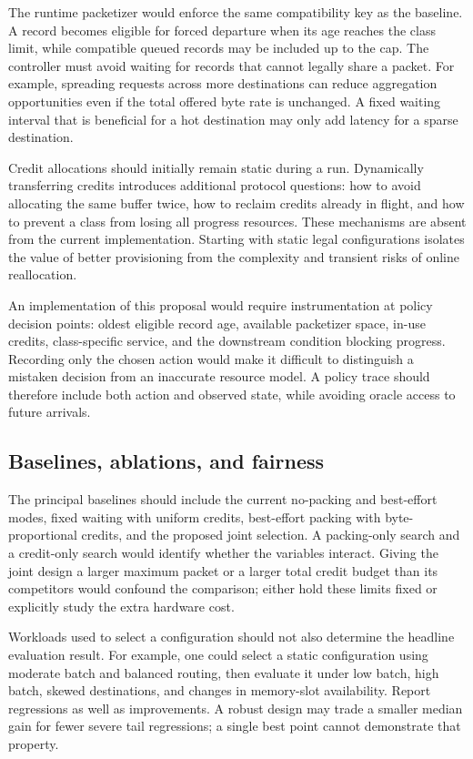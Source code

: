The runtime packetizer would enforce the same compatibility key as the baseline. A record becomes eligible for forced departure when its age reaches the class limit, while compatible queued records may be included up to the cap. The controller must avoid waiting for records that cannot legally share a packet. For example, spreading requests across more destinations can reduce aggregation opportunities even if the total offered byte rate is unchanged. A fixed waiting interval that is beneficial for a hot destination may only add latency for a sparse destination.

Credit allocations should initially remain static during a run. Dynamically transferring credits introduces additional protocol questions: how to avoid allocating the same buffer twice, how to reclaim credits already in flight, and how to prevent a class from losing all progress resources. These mechanisms are absent from the current implementation. Starting with static legal configurations isolates the value of better provisioning from the complexity and transient risks of online reallocation.

An implementation of this proposal would require instrumentation at policy decision points: oldest eligible record age, available packetizer space, in-use credits, class-specific service, and the downstream condition blocking progress. Recording only the chosen action would make it difficult to distinguish a mistaken decision from an inaccurate resource model. A policy trace should therefore include both action and observed state, while avoiding oracle access to future arrivals.

\subsection{Baselines, ablations, and fairness}
The principal baselines should include the current no-packing and best-effort modes, fixed waiting with uniform credits, best-effort packing with byte-proportional credits, and the proposed joint selection. A packing-only search and a credit-only search would identify whether the variables interact. Giving the joint design a larger maximum packet or a larger total credit budget than its competitors would confound the comparison; either hold these limits fixed or explicitly study the extra hardware cost.

Workloads used to select a configuration should not also determine the headline evaluation result. For example, one could select a static configuration using moderate batch and balanced routing, then evaluate it under low batch, high batch, skewed destinations, and changes in memory-slot availability. Report regressions as well as improvements. A robust design may trade a smaller median gain for fewer severe tail regressions; a single best point cannot demonstrate that property.

